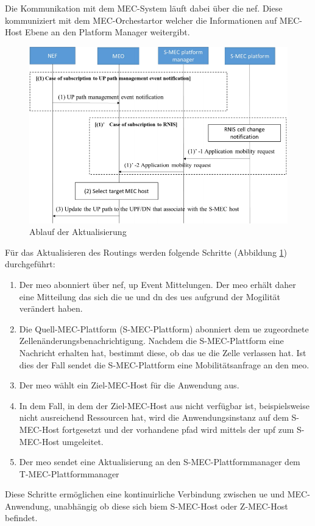 \documentclass[runningheads]{llncs}
\numberwithin{figure}{section}
\begin{document}
Die Kommunikation mit dem MEC-System läuft dabei über die \acrshort{nef}. Diese kommuniziert mit dem MEC-Orchestartor welcher
die Informationen auf MEC-Host Ebene an den Platform Manager weitergibt.
\begin{figure}
  \includegraphics[width=\linewidth]{images/Datenverkehr_Ablauf.png}
  \caption{Ablauf der Aktualisierung}
  \label{fig:Datenverkehr_Ablauf}
\end{figure}
Für das Aktualisieren des Routings werden folgende Schritte (Abbildung \ref{fig:Datenverkehr_Ablauf}) durchgeführt:
\begin{enumerate}
  \item Der \acrfull{meo} abonniert über \acrshort{nef}, \acrshort{up} Event Mittelungen. 
  Der \acrshort{meo} erhält daher eine Mitteilung das sich die \acrshort{ue} und \acrshort{dn} des
  \acrshort{ue}s aufgrund der Mogilität verändert haben.
  \item Die Quell-MEC-Plattform (S-MEC-Plattform) abonniert dem \acrshort{ue} zugeordnete Zellenänderungsbenachrichtigung. 
  Nachdem die S-MEC-Plattform eine Nachricht erhalten hat, bestimmt diese, ob das \acrshort{ue} die Zelle verlassen hat. 
  Ist dies der Fall sendet die S-MEC-Plattform eine Mobilitätsanfrage an den \acrshort{meo}.
  \item Der \acrshort{meo} wählt ein Ziel-MEC-Host für die Anwendung aus.
  \item In dem Fall, in dem der Ziel-MEC-Host aus nicht verfügbar ist, beispielsweise nicht ausreichend Ressourcen hat,
  wird die Anwendungsinstanz auf dem S-MEC-Host fortgesetzt und der vorhandene pfad wird mittels der \acrshort{upf} zum S-MEC-Host umgeleitet.
  \item Der \acrshort{meo} sendet eine Aktualisierung an den S-MEC-Plattformmanager dem T-MEC-Plattformmanager
\end{enumerate}
Diese Schritte ermöglichen eine kontinuirliche Verbindung zwischen \acrshort{ue} und MEC-Anwendung, unabhängig ob diese sich biem S-MEC-Host oder Z-MEC-Host befindet.
\end{document}

